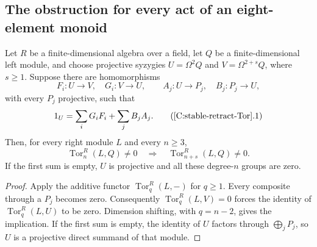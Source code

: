 \subsection{The obstruction for every act of an eight-element monoid}

\begin{lemma}
\label{C:stable-retract-Tor}
Let $R$ be a finite-dimensional algebra over a field, let $Q$ be
a finite-dimensional left module, and choose projective syzygies
$U=\Omega^2Q$ and $V=\Omega^{2+s}Q$, where $s\geq1$.
Suppose there are homomorphisms
\[
 F_i:U\longrightarrow V,\quad G_i:V\longrightarrow U,
 \qquad
 A_j:U\longrightarrow P_j,\quad B_j:P_j\longrightarrow U,
\]
with every $P_j$ projective, such that
\[
 1_U=\sum_i G_iF_i+\sum_j B_jA_j.                         \tag{\ref{C:stable-retract-Tor}.1}
\]
Then, for every right module $L$ and every $n\geq3$,
\[
 \operatorname{Tor}_n^R(L,Q)\ne0
 \quad\Longrightarrow\quad
 \operatorname{Tor}_{n+s}^R(L,Q)\ne0.
\]
If the first sum is empty, $U$ is projective and all these
degree-$n$ groups are zero.
\end{lemma}
\begin{proof}
Apply the additive functor $\operatorname{Tor}_q^R(L,-)$ for
$q\geq1$. Every composite through a $P_j$ becomes zero.
Consequently $\operatorname{Tor}_q^R(L,V)=0$ forces the identity
of $\operatorname{Tor}_q^R(L,U)$ to be zero. Dimension shifting,
with $q=n-2$, gives the implication. If the first sum is empty,
the identity of $U$ factors through $\bigoplus_jP_j$, so $U$
is a projective direct summand of that module.
\end{proof}

